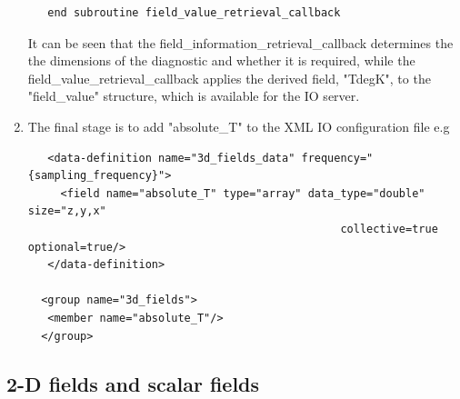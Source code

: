 \documentclass[a4paper,11pt]{article}
\begin{document}
\begin{enumerate}
{\begin{lstlisting}
   end subroutine field_value_retrieval_callback
   \end{lstlisting}
   It can be seen that the field\_information\_retrieval\_callback determines the
   the dimensions of the diagnostic and whether it is required, while the
   field\_value\_retrieval\_callback applies the derived field, "TdegK", to the
   "field\_value" structure, which is available for the IO server.
   }
   \item{The final stage is to add "absolute\_T" to the XML IO configuration file
   e.g
   \begin{lstlisting}
   <data-definition name="3d_fields_data" frequency="{sampling_frequency}">
     <field name="absolute_T" type="array" data_type="double" size="z,y,x"
                                                collective=true optional=true/>
   </data-definition>

  <group name="3d_fields">
   <member name="absolute_T"/>
  </group>
   \end{lstlisting}}
\end{enumerate}

\subsection{2-D fields and scalar fields}
\end{document}
